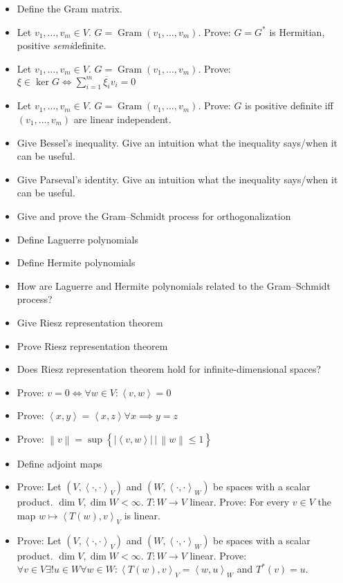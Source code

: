 \documentclass[a4paper]{article}
\newcommand{\setdef}[2]{\left\{\left.#1\,\right|\,#2\right\}}
\newcommand{\ip}[2]{\left\langle#1,#2\right\rangle} %
\newcommand{\norm}[1]{\left\|#1\right\|}
\newcommand{\card}[1]{\left|#1\right|}
\begin{document}
\begin{itemize}
  \item Define the Gram matrix.
  \item Let $v_1, \ldots, v_m \in V$. $G = \operatorname{Gram}(v_1, \ldots, v_m)$. Prove: $G = G^*$ is Hermitian, positive \emph{semi}definite.
  \item Let $v_1, \ldots, v_m \in V$. $G = \operatorname{Gram}(v_1, \ldots, v_m)$. Prove: $\xi \in \ker{G} \iff \sum_{i=1}^m \overline{\xi_i} v_i = 0$
  \item Let $v_1, \ldots, v_m \in V$. $G = \operatorname{Gram}(v_1, \ldots, v_m)$. Prove: $G$ is positive definite iff $(v_1, \ldots, v_m)$ are linear independent.
  \item Give Bessel's inequality. Give an intuition what the inequality says/when it can be useful.
  \item Give Parseval's identity. Give an intuition what the inequality says/when it can be useful.
  \item Give and prove the Gram--Schmidt process for orthogonalization
  \item Define Laguerre polynomials
  \item Define Hermite polynomials
  \item How are Laguerre and Hermite polynomials related to the Gram--Schmidt process?
  \item Give Riesz representation theorem
  \item Prove Riesz representation theorem
  \item Does Riesz representation theorem hold for infinite-dimensional spaces?
  \item Prove: $v = 0 \iff \forall w \in V: \ip vw = 0$
  \item Prove: $\ip xy = \ip xz \forall x \implies y = z$
  \item Prove: $\norm{v} = \sup\setdef{\card{\ip vw}}{\norm{w} \leq 1}$
  \item Define adjoint maps
  \item Prove: Let $(V, \ip{\cdot}{\cdot}_V)$ and $(W, \ip{\cdot}{\cdot}_W)$ be spaces with a scalar product. $\dim{V}, \dim{W} < \infty$.
    $T: W \to V$ linear. Prove: For every $v \in V$ the map $w \mapsto \ip{T(w)}{v}_V$ is linear.
  \item Prove: Let $(V, \ip{\cdot}{\cdot}_V)$ and $(W, \ip{\cdot}{\cdot}_W)$ be spaces with a scalar product. $\dim{V}, \dim{W} < \infty$.
    $T: W \to V$ linear. Prove: $\forall v \in V \exists! u \in W \forall w \in W: \ip{T(w)}{v}_V = \ip{w}{u}_W$ and $T^*(v) = u$.

\end{itemize}
\end{document}
